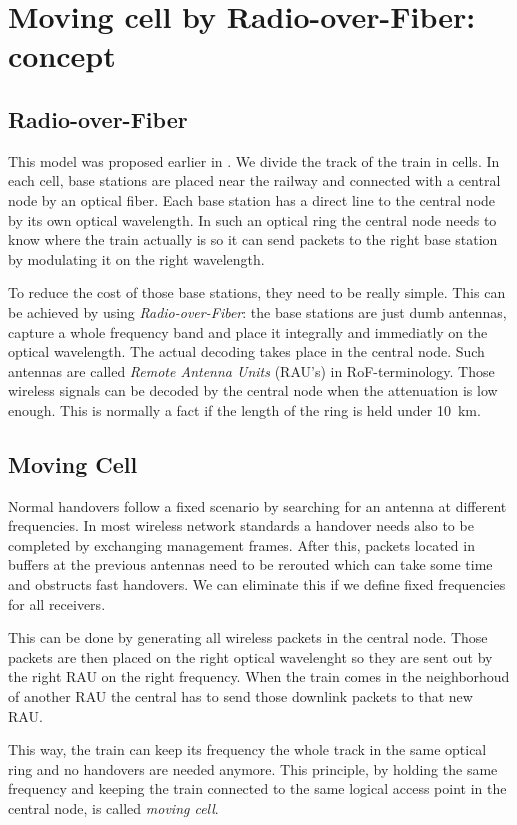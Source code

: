\documentclass[twocolumn]{phdsymp} %
\begin{document}
\section{Moving cell by Radio-over-Fiber: concept}

\subsection{Radio-over-Fiber}
This model was proposed earlier in \cite{paper}.  We divide the track of the train in cells.  In each cell, base stations are placed near the railway and connected with a central node by an optical fiber.  Each base station has a direct line to the central node by its own optical wavelength.  In such an optical ring the central node needs to know where the train actually is so it can send packets to the right base station by modulating it on the right wavelength.

To reduce the cost of those base stations, they need to be really simple.  This can be achieved by using \textit{Radio-over-Fiber}: the base stations are just dumb antennas, capture a whole frequency band and place it integrally and immediatly on the optical wavelength.  The actual decoding takes place in the central node.  Such antennas are called \textit{Remote Antenna Units} (RAU's) in RoF-terminology.  Those wireless signals can be decoded by the central node when the attenuation is low enough.  This is normally a fact if the length of the ring is held under 10~km.

\subsection{Moving Cell}
Normal handovers follow a fixed scenario by searching for an antenna at different frequencies.  In most wireless network standards a handover needs also to be completed by exchanging management frames.  After this, packets located in buffers at the previous antennas need to be rerouted which can take some time and obstructs fast handovers.  We can eliminate this if we define fixed frequencies for all receivers.

This can be done by generating all wireless packets in the central node.  Those packets are then placed on the right optical wavelenght so they are sent out by the right RAU on the right frequency.  When the train comes in the neighborhoud of another RAU the central has to send those downlink packets to that new RAU.

This way, the train can keep its frequency the whole track in the same optical ring and no handovers are needed anymore.  This principle, by holding the same frequency and keeping the train connected to the same logical access point in the central node, is called \textit{moving cell}.
\end{document}
